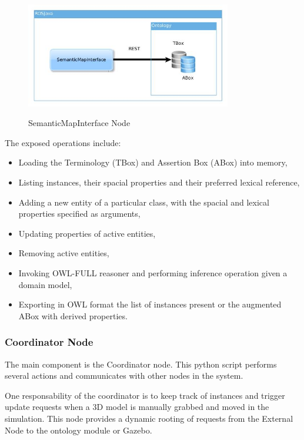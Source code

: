 \begin{figure}[H]
\centering
\includegraphics[width=0.8\textwidth]{imgs/semantic.jpg}
\label{fig:actions}
\caption{SemanticMapInterface Node}
\end{figure}

The exposed operations include:

\begin{itemize}
\item Loading the Terminology (TBox) and Assertion Box (ABox) into memory,
\item Listing instances, their spacial properties and their preferred lexical reference,
\item Adding a new entity of a particular class, with the spacial and lexical properties specified as arguments,
\item Updating properties of active entities,
\item Removing active entities,
\item Invoking OWL-FULL reasoner and performing inference operation given a domain model, 
\item Exporting in OWL format the list of instances present or the augmented ABox with derived properties.

\end{itemize}


\subsubsection{Coordinator Node}
The main component is the Coordinator node. This python script performs several actions and communicates with other nodes in the system. 

One responsability of the coordinator is to keep track of instances and trigger update requests when a 3D model is manually grabbed and moved in the simulation. This node provides a dynamic rooting of requests from the External Node to the ontology module or Gazebo. 

